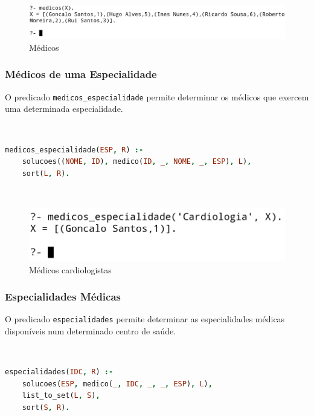 \documentclass[a4paper, 11pt]{article}
\begin{document}
\

\begin{figure}[H]
    \centering
    \includegraphics[width=\textwidth]{img/medicos.png}
    \caption{Médicos}
\end{figure}

\subsubsection{Médicos de uma Especialidade}

O predicado \texttt{medicos\_especialidade} permite determinar os médicos que exercem uma determinada especialidade.

\

\begin{lstlisting}[language=Prolog, caption={Extensão do predicado \texttt{medicos\_especialidade}}]
% Extensao do predicado medicos_especialidade: ESP, R -> {V, F}
medicos_especialidade(ESP, R) :- 
    solucoes((NOME, ID), medico(ID, _, NOME, _, ESP), L),
    sort(L, R).
\end{lstlisting}

\

\begin{figure}[H]
    \centering
    \includegraphics[width=.55\textwidth]{img/cardiologia.png}
    \caption{Médicos cardiologistas}
\end{figure}

\subsubsection{Especialidades Médicas}

O predicado \texttt{especialidades} permite determinar as especialidades médicas disponíveis num determinado
centro de saúde.

\

\begin{lstlisting}[language=Prolog, caption={Extensão do predicado \texttt{especialidades}}]
% Extensao do predicado especialidades: IDC, R -> {V, F}
especialidades(IDC, R) :- 
    solucoes(ESP, medico(_, IDC, _, _, ESP), L),
    list_to_set(L, S),
    sort(S, R).
\end{lstlisting}
\end{document}
